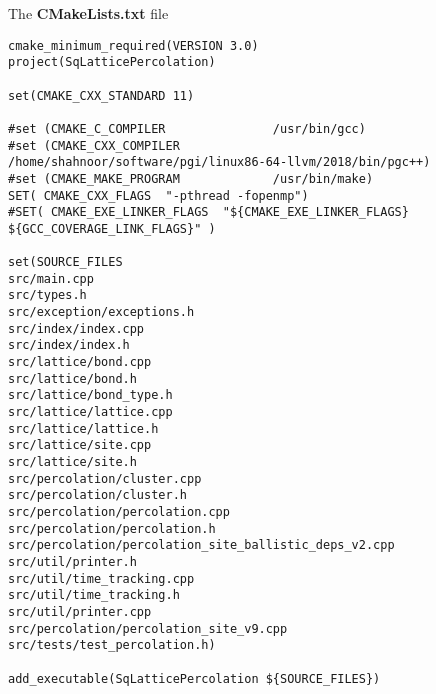 
The \textbf{CMakeLists.txt} file

\begin{lstlisting}
cmake_minimum_required(VERSION 3.0)
project(SqLatticePercolation)

set(CMAKE_CXX_STANDARD 11)

#set (CMAKE_C_COMPILER               /usr/bin/gcc)
#set (CMAKE_CXX_COMPILER             /home/shahnoor/software/pgi/linux86-64-llvm/2018/bin/pgc++)
#set (CMAKE_MAKE_PROGRAM             /usr/bin/make)
SET( CMAKE_CXX_FLAGS  "-pthread -fopenmp")
#SET( CMAKE_EXE_LINKER_FLAGS  "${CMAKE_EXE_LINKER_FLAGS} ${GCC_COVERAGE_LINK_FLAGS}" )

set(SOURCE_FILES
src/main.cpp
src/types.h
src/exception/exceptions.h
src/index/index.cpp
src/index/index.h
src/lattice/bond.cpp
src/lattice/bond.h
src/lattice/bond_type.h
src/lattice/lattice.cpp
src/lattice/lattice.h
src/lattice/site.cpp
src/lattice/site.h
src/percolation/cluster.cpp
src/percolation/cluster.h
src/percolation/percolation.cpp
src/percolation/percolation.h
src/percolation/percolation_site_ballistic_deps_v2.cpp
src/util/printer.h
src/util/time_tracking.cpp
src/util/time_tracking.h
src/util/printer.cpp
src/percolation/percolation_site_v9.cpp
src/tests/test_percolation.h)

add_executable(SqLatticePercolation ${SOURCE_FILES})

\end{lstlisting}